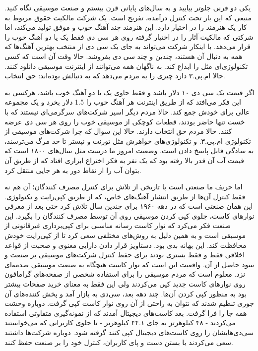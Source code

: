 یکی دو قرنی جلوتر بیایید و به سال‌های پایانی قرن بیستم و صنعت موسیقی
نگاه کنید. منبعی که این بار تحت کنترل درآمده، تفریح است. یک شرکت
مالکیت حقوق مربوط به کار یک هنرمند را در اختیار دارد. این هنرمند چند
آهنگ خوب و موفق تولید می‌کند، اما شرکتی که مالکیت آثار را در اختیار
گرفته روی هر سی دی فقط یک یا دو آهنگ خوب را قرار می‌دهد. با اینکار شرکت
می‌تواند به جای یک سی دی از منتخب بهترین آهنگ‌ها که همه به دنبال آن
هستند، چندین و چند سی دی بفروشد. حالا وقت آن است که کسی تکنولوژی‌ای مثل
 را ابداع کند. به ناگهان همه می‌توانند از اینترنت موسیقی دانلود
کنند. حالا ام.پی.۳ دارد چیزی را به مردم می‌دهد که به دنبالش بوده‌اند: حق
انتخاب.

اگر قیمت یک سی دی ۱۰ دلار باشد و فقط حاوی یک یا دو آهنگ خوب باشد،
هرکسی به این فکر می‌افتد که از طریق اینترنت هر آهنگ خوب را 1.5 دلار
بخرد و یک مجموعه عالی برای خودش جمع کند. حالا مردم دیگر اسیر شرکت‌های
سرگرمی‌ای نیستند که با خست تنها حاضر بودند، قطعات کوچکی از موسیقی خوب
را روی هر سی دی عرضه کنند. حالا مردم حق انتخاب دارند. حالا این سوال که
چرا شرکت‌های موسیقی از تکنولوژی ام.پی.۳. و تکنولوژی‌های خواهرش مثل تورنت
و نپستر تا حد مرگ می‌ترسند، به سادگی قابل پاسخ دادن است. وضعیت امروز ما
درست مثل سال‌های ۱۸۰۰ است که قیمت آب آن قدر بالا رفته بود که یک نفر به
فکر اختراع ابزاری افتاد که از طریق آن بتوان آب را از نقاط دور به هر
جایی منتقل کرد.

اما حریف ما صنعتی است با تاریخی از تلاش برای کنترل مصرف کنندگان؛ آن هم
نه فقط کنترل آن‌ها از طریق انتشار آهنگ‌های خاص، که از طریق کپی‌رایت و
تکنولوژی. این همان صنعتی است که در دهه ۱۹۶۰ برای چندین سال تلاش کرد
حتی بعد از معرفی نوارهای کاست، جلوی کپی کردن موسیقی روی آن توسط مصرف
کنندگان را بگیرد. این صنعت فکر می‌کرد که نوار کاست رسانه مناسبی برای
کپی‌برداری غیرقانونی از موسیقی است و به همین دلیل به روش‌های مختلفی سعی
کرد تا از کپی‌رایت خودش محافظت کند. این بهانه بدی بود. دستاویز قرار
دادن دارایی معنوی و صحبت از قواعد اخلاقی فقط و فقط بستری بودند برای
حفظ کنترل شرکت‌های موسیقی بر صنعت و سود حاصل از آن. واقعیت این است که
نوار کاست هیچگاه به صنعت موسیقی صدمه‌ای نزد. معلوم است که مردم موسیقی
را برای استفاده شخصی از صفحه‌های گرامافون روی نوارهای کاست جدید کپی
می‌کردند ولی این فقط به معنای خرید صفحات بیشتر بود به منظور کپی کردن
آن‌ها. چند دهه بعد، سی‌دی به بازار آمد و پخش‌ کننده‌های آن جوری تنظیم شدند
که نتوان به راحتی از آن روی نوار کاست کپی گرفت. دوباره وحشت همه جا را
فرا گرفت. بعد کاست‌های دیجیتال آمدند که از نمونه‌گیری متفاوتی استفاده
می‌کردند - ۴۸ کیلوهرتز به جای ۴۴.۱ کیلوهرتز - تا جلوی کاربرانی که
می‌خواستند سی‌دی‌هایشان را روی کاست‌های دیجیتال کپی کنند گرفته شود. دوباره
شرکت‌ها داشتند سعی می‌کردند با بستن دست و پای کاربران، کنترل خود را بر
صنعت حفظ کنند.

